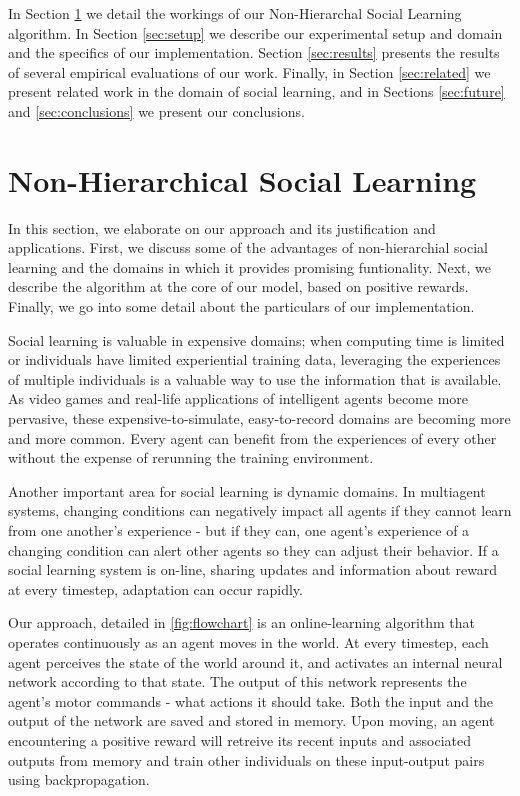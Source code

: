\documentclass{acm_proc_article-sp}
\begin{document}
 In Section \ref{sec:nhsl} we detail the workings of our Non-Hierarchal Social Learning algorithm.
In Section \ref{sec:setup} we describe our experimental setup and domain and the specifics of our implementation.
Section \ref{sec:results} presents the results of several empirical evaluations of our work.
Finally, in Section \ref{sec:related} we present related work in the domain of social learning, and in Sections \ref{sec:future} and \ref{sec:conclusions} we present our conclusions.

\section{Non-Hierarchical Social Learning}
\label{sec:nhsl}
In this section, we elaborate on our approach and its justification and applications. First, we discuss some of the advantages of non-hierarchial social learning and the domains in which it provides promising funtionality.  Next, we describe the algorithm at the core of our model, based on positive rewards.  Finally, we go into some detail about the particulars of our implementation.

Social learning is valuable in expensive domains; when computing time is limited or individuals have limited experiential training data, leveraging the experiences of multiple individuals is a valuable way to use the information that is available. As video games and real-life applications of intelligent agents become more pervasive, these expensive-to-simulate, easy-to-record domains are becoming more and more common. Every agent can benefit from the experiences of every other without the expense of rerunning the training environment.  

Another important area for social learning is dynamic domains.  In multiagent systems, changing conditions can negatively impact all agents if they cannot learn from one another's experience - but if they can, one agent's experience of a changing condition can alert other agents so they can adjust their behavior. If a social learning system is on-line, sharing updates and information about reward at every timestep, adaptation can occur rapidly.

Our approach, detailed in \ref{fig:flowchart} is an online-learning algorithm that operates continuously as an agent moves in the world.  At every timestep, each agent perceives the state of the world around it, and activates an internal neural network according to that state.  The output of this network represents the agent's motor commands - what actions it should take. Both the input and the output of the network are saved and stored in memory. Upon moving, an agent encountering a positive reward will retreive its recent inputs and associated outputs from memory and train other individuals on these input-output pairs using backpropagation.
\end{document}
